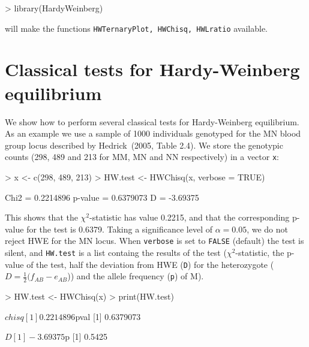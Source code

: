 \documentclass[a4paper]{article}
\begin{document}
\begin{Schunk}
\begin{Sinput}
> library(HardyWeinberg)
\end{Sinput}
\end{Schunk}

will make the functions {\tt HWTernaryPlot, HWChisq, HWLratio} available. 

\section{Classical tests for Hardy-Weinberg equilibrium}
\label{sec:classical}

We show how to perform several classical tests for Hardy-Weinberg equilibrium. As an example we
use a sample of 1000 individuals genotyped for the MN blood group locus described by
Hedrick~(2005, Table 2.4). We store the genotypic counts (298, 489 and 213 for MM, MN and NN
respectively) in a vector {\tt x}:

\begin{Schunk}
\begin{Sinput}
> x <- c(298, 489, 213)
> HW.test <- HWChisq(x, verbose = TRUE)
\end{Sinput}
\begin{Soutput}
Chi2 =  0.2214896 p-value =  0.6379073 D =  -3.69375 
\end{Soutput}
\end{Schunk}

This shows that the $\chi^2$-statistic has value 0.2215, and that the corresponding p-value for 
the test is 0.6379. Taking a significance level of $\alpha = 0.05$, we do not reject HWE for
the MN locus. When {\tt verbose} is set to {\tt FALSE} (default) the test is silent, and {\tt HW.test}
is a list containg the results of the test ($\chi^2$-statistic, the p-value of the test, half the deviation from 
HWE ({\tt D}) for the heterozygote ($D = \frac{1}{2} (f_{AB} - e_{AB}$)) 
and the allele frequency ({\tt p}) of M).

\begin{Schunk}
\begin{Sinput}
> HW.test <- HWChisq(x)
> print(HW.test)
\end{Sinput}
\begin{Soutput}
$chisq
[1] 0.2214896

$pval
[1] 0.6379073

$D
[1] -3.69375

$p
[1] 0.5425
\end{Soutput}
\end{Schunk}
\end{document}
